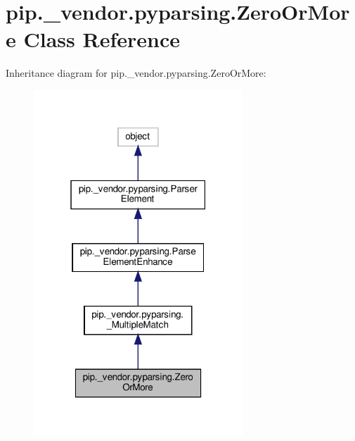\hypertarget{classpip_1_1__vendor_1_1pyparsing_1_1ZeroOrMore}{}\section{pip.\+\_\+vendor.\+pyparsing.\+Zero\+Or\+More Class Reference}
\label{classpip_1_1__vendor_1_1pyparsing_1_1ZeroOrMore}


Inheritance diagram for pip.\+\_\+vendor.\+pyparsing.\+Zero\+Or\+More\+:
\nopagebreak
\begin{figure}[H]
\begin{center}
\leavevmode
\includegraphics[width=223pt]{classpip_1_1__vendor_1_1pyparsing_1_1ZeroOrMore__inherit__graph}
\end{center}
\end{figure}


